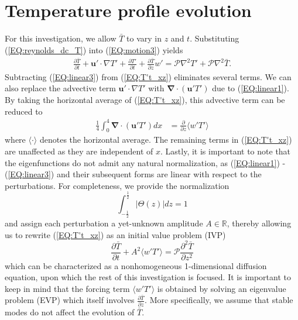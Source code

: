 \documentclass[reprint,amsmath,amssymb,aps]{revtex4-1}
\renewcommand{\vec}[1]{\boldsymbol{#1}}
\newcommand{\grad}{\vec{\nabla}}
\begin{document}
\section{Temperature profile evolution}\label{sec:evolution}
For this investigation, we allow $ \bar{T}$ to vary in $z$ and $t$. Substituting (\ref{EQ:reynolds_dc_T}) into (\ref{EQ:motion3}) yields
\begin{align}
    \frac{\partial \bar{T}}{\partial t} + \mathbf{u}' \cdot \nabla T' + \frac{\partial T'}{\partial t} + \frac{\partial \bar{T}}{\partial z} w' = \mathcal{P} \nabla^2 T' + \mathcal{P} \nabla^2 \bar{T}.
    \label{EQ:T't_xz}
\end{align}
Subtracting (\ref{EQ:linear3}) from (\ref{EQ:T't_xz}) eliminates several terms. We can also replace the advective term $\mathbf{u}' \cdot \nabla T'$ with $\grad \cdot (\mathbf{u}'T')$ due to (\ref{EQ:linear1}). By taking the horizontal average of (\ref{EQ:T't_xz}), this advective term can be reduced to
\begin{align}
    \frac{1}{4}\int_0^4 \grad \cdot (\mathbf{u}'T') dx &= \frac{\partial }{\partial z}  \langle w'T' \rangle
\end{align}
where $\langle \cdot \rangle$ denotes the horizontal average. The remaining terms in (\ref{EQ:T't_xz}) are unaffected as they are independent of $x$. Lastly, it is important to note that the eigenfunctions do not admit any natural normalization, as (\ref{EQ:linear1}) - (\ref{EQ:linear3}) and their subsequent forms are linear with respect to the perturbations. For completeness, we provide the normalization 
\begin{equation}
    \int_{-\frac{1}{2}}^{\frac{1}{2}} \big| \Theta (z) \big| dz = 1
\end{equation}
and assign each perturbation a yet-unknown amplitude $A \in \mathbb{R}$, thereby allowing us to rewrite (\ref{EQ:T't_xz}) as an initial value problem (IVP)
\begin{equation}
    \frac{\partial \bar{T}}{\partial t} + A^2 \langle w'T' \rangle = \mathcal{P}  \frac{\partial^2 \bar{T}}{\partial z^2} \label{EQ:T0_IVP}
\end{equation}
which can be characterized as a nonhomogeneous  1-dimensional diffusion equation, upon which the rest of this investigation is focused. It is important to keep in mind that the forcing term $\langle w'T' \rangle$ is obtained by solving an eigenvalue problem (EVP) which itself involves $\frac{\partial \bar{T}}{\partial z}$. More specifically, we assume that stable modes do not affect the evolution of $\bar{T}$.
\end{document}
